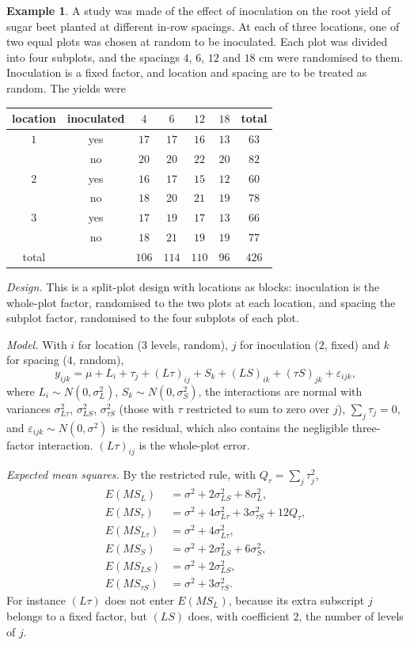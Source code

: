 \documentclass[11pt,a4paper]{article}
\numberwithin{equation}{section}
\theoremstyle{definition}
\newtheorem{exa}[thm]{Example}
\begin{document}
\begin{exa}\label{exa:sugarbeet}
A study was made of the effect of inoculation on the root yield of sugar beet planted at different in-row spacings. At each of three locations,
one of two equal plots was chosen at random to be inoculated. Each plot was divided into four subplots, and the spacings $4$, $6$, $12$ and $18$ cm were
randomised to them. Inoculation is a fixed factor, and location and spacing are to be treated as random. The yields were
\begin{center}
\begin{tabular}{cc|cccc|c}
location & inoculated & $4$ & $6$ & $12$ & $18$ & total \\
\hline
$1$ & yes & $17$ & $17$ & $16$ & $13$ & $63$ \\
& no & $20$ & $20$ & $22$ & $20$ & $82$ \\
$2$ & yes & $16$ & $17$ & $15$ & $12$ & $60$ \\
& no & $18$ & $20$ & $21$ & $19$ & $78$ \\
$3$ & yes & $17$ & $19$ & $17$ & $13$ & $66$ \\
& no & $18$ & $21$ & $19$ & $19$ & $77$ \\
\hline
total & & $106$ & $114$ & $110$ & $96$ & $426$
\end{tabular}
\end{center}
\emph{Design.} This is a split-plot design with locations as blocks: inoculation is the whole-plot factor, randomised to the two plots at each location,
and spacing the subplot factor, randomised to the four subplots of each plot.

\emph{Model.} With $i$ for location ($3$ levels, random), $j$ for inoculation ($2$, fixed) and $k$ for spacing ($4$, random),
\[
y_{ijk} = \mu + L_i + \tau_j + (L\tau)_{ij} + S_k + (LS)_{ik} + (\tau S)_{jk} + \varepsilon_{ijk} ,
\]
where $L_i \sim N(0, \sigma^2_L)$, $S_k \sim N(0, \sigma^2_S)$, the interactions are normal with variances $\sigma^2_{L\tau}$, $\sigma^2_{LS}$, $\sigma^2_{\tau S}$ (those with $\tau$ restricted to sum to zero over $j$),
$\sum_j\tau_j = 0$, and $\varepsilon_{ijk} \sim N(0, \sigma^2)$ is the residual, which also contains the negligible three-factor interaction. $(L\tau)_{ij}$ is the whole-plot error.

\emph{Expected mean squares.} By the restricted rule, with $Q_\tau = \sum_j\tau_j^2$,
\begin{align*}
E(MS_L) &= \sigma^2 + 2\sigma^2_{LS} + 8\sigma^2_L , \\
E(MS_\tau) &= \sigma^2 + 4\sigma^2_{L\tau} + 3\sigma^2_{\tau S} + 12Q_\tau , \\
E(MS_{L\tau}) &= \sigma^2 + 4\sigma^2_{L\tau} , \\
E(MS_S) &= \sigma^2 + 2\sigma^2_{LS} + 6\sigma^2_S , \\
E(MS_{LS}) &= \sigma^2 + 2\sigma^2_{LS} , \\
E(MS_{\tau S}) &= \sigma^2 + 3\sigma^2_{\tau S} .
\end{align*}
For instance $(L\tau)$ does not enter $E(MS_L)$, because its extra subscript $j$ belongs to a fixed factor, but $(LS)$ does, with coefficient $2$, the number of
levels of $j$.


\end{exa}
\end{document}
